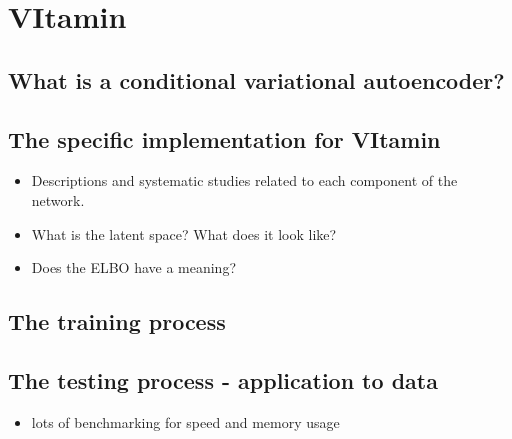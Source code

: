 \documentclass[%
showpacs,
 amsmath,amssymb,
 aps,
 twocolumn,
 prl,
 reprint,
floatfix,
]{revtex4-1}
\begin{document}
\section{VItamin}

\subsection{What is a conditional variational autoencoder?}

\subsection{The specific implementation for VItamin}

\begin{itemize}
\item Descriptions and systematic studies related to each component of the
network.
\item What is the latent space? What does it look like?
\item Does the ELBO have a meaning?
\end{itemize}

\subsection{The training process}

\subsection{The testing process - application to data}

\begin{itemize}
\item lots of benchmarking for speed and memory usage
\end{itemize}

\end{document}

